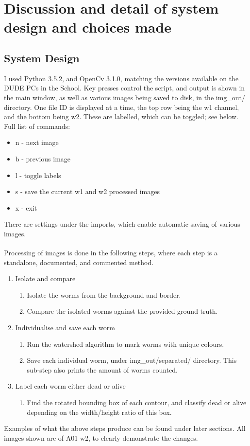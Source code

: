 \documentclass[a4paper,12pt]{article}
\begin{document}
\section*{Discussion and detail of system design and choices made}
\subsection*{System Design}
I used Python 3.5.2, and OpenCv 3.1.0, matching the versions available on the DUDE PCs in the School.
Key presses control the script, and output is shown in the main window, as well as various images being saved to disk, in the img\_out/ directory.
One file ID is displayed at a time, the top row being the w1 channel, and the bottom being w2. These are labelled, which can be toggled; see below.
Full list of commands:
\begin{itemize}
    \item n - next image
    \item b - previous image
    \item l - toggle labels
    \item s - save the current w1 and w2 processed images
    \item x - exit
\end{itemize}
There are settings under the imports, which enable automatic saving of various images.
\\\\
Processing of images is done in the following steps, where each step is a standalone, documented, and commented method.
\begin{enumerate}
    \item Isolate and compare
    \begin{enumerate}
        \item Isolate the worms from the background and border.
        \item Compare the isolated worms against the provided ground truth.
    \end{enumerate}

    \item Individualise and save each worm
    \begin{enumerate}
        \item Run the watershed algorithm to mark worms with unique colours.
        \item Save each individual worm, under img\_out/separated/ directory. This sub-step also prints the amount of worms counted.
    \end{enumerate}

    \item Label each worm either dead or alive
    \begin{enumerate}
        \item Find the rotated bounding box of each contour, and classify dead or alive depending on the width/height ratio of this box.
    \end{enumerate}
\end{enumerate}
Examples of what the above steps produce can be found under later sections. All images shown are of A01 w2, to clearly demonstrate the changes.
\end{document}
